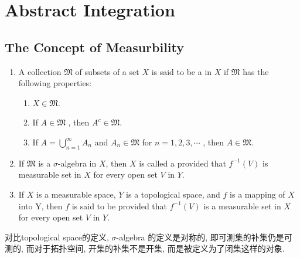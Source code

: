 \documentclass[../main.tex]{subfiles}
\begin{document}
\chapter{ Abstract Integration }

\section{The Concept of Measurbility}

\begin{definition}{}{}
    \begin{enumerate}
        \item A collection \(  \mathfrak{M}  \) of subsets of a set \(  X  \) is said to be a  in \(  X  \) if \(  \mathfrak{M}  \) has the following properties: \begin{enumerate}
            \item \(  X \in \mathfrak{M}  \). 
            \item If \(  A \in \mathfrak{M}  \)  , then \(  A^{c} \in  \mathfrak{M}  \).
            \item If \(  A =  \bigcup _{n = 1}^{\infty} A_{n}  \) and \(  A_{n} \in  \mathfrak{M}  \) for \(  n = 1,2,3,\cdots   \) , then \(  A \in \mathfrak{M}  \).      
        \end{enumerate}
        \item If \(  \mathfrak{M}  \) is a \(   \sigma   \)-algebra in \(  X  \), then \(  X  \) is called a  provided that \(  f^{-1} \left( V \right)   \) is measurable set in \(  X  \) for every open set \(  V  \) in \(  Y  \).         
        \item If \(  X  \) is a measurable space, \(  Y  \) is a topological space, and \(  f   \) is a mapping of \(  X  \) into Y, then \(  f  \) is said to be  provided that \(  f^{-1} \left( V \right)   \) is a measurable set in \(  X  \) for every open set \(  V  \) in \(  Y  \).          
             
    \end{enumerate}
    
\end{definition}

\begin{note}
    对比topological space的定义, \(   \sigma   \)-algebra 的定义是对称的, 即可测集的补集仍是可测的, 而对于拓扑空间, 开集的补集不是开集, 而是被定义为了闭集这样的对象.
\end{note}
\end{document}
